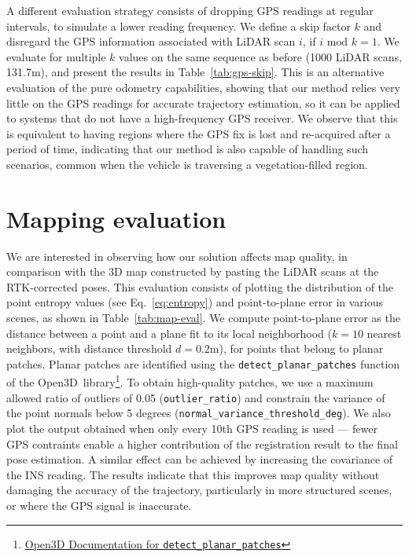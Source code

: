 A different evaluation strategy consists of dropping GPS readings at regular intervals, to simulate a lower reading frequency. We define a skip factor $k$ and disregard the GPS information associated with LiDAR scan $i$, if $i \text{ mod } k =1$. We evaluate for multiple $k$ values on the same sequence as before (1000 LiDAR scans, 131.7m), and present the results in Table~\ref{tab:gps-skip}. This is an alternative evaluation of the pure odometry capabilities, showing that our method relies very little on the GPS readings for accurate trajectory estimation, so it can be applied to systems that do not have a high-frequency GPS receiver. We observe that this is equivalent to having regions where the GPS fix is lost and re-acquired after a period of time, indicating that our method is also capable of handling such scenarios, common when the vehicle is traversing a vegetation-filled region.

\section{Mapping evaluation}

We are interested in observing how our solution affects map quality, in comparison with the 3D map constructed by pasting the LiDAR scans at the RTK-corrected poses. This evaluation consists of plotting the distribution of the point entropy values (see Eq.~\ref{eq:entropy}) and point-to-plane error in various scenes, as shown in Table~\ref{tab:map-eval}. We compute point-to-plane error as the distance between a point and a plane fit to its local neighborhood ($k=10$ nearest neighbors, with distance threshold $d=0.2$m), for points that belong to planar patches. Planar patches are identified using the \texttt{detect\_planar\_patches} function of the Open3D~library\footnote{\href{https://www.open3d.org/docs/latest/python_api/open3d.geometry.PointCloud.html\#open3d.geometry.PointCloud.detect_planar_patches}{Open3D Documentation for \texttt{detect\_planar\_patches}}}. To obtain high-quality patches, we use a maximum allowed ratio of outliers of 0.05 (\texttt{outlier\_ratio}) and constrain the variance of the point normals below 5 degrees (\texttt{normal\_variance\_threshold\_deg}).
We also plot the output obtained when only every 10th GPS reading is used --- fewer GPS contraints enable a higher contribution of the registration result to the final pose estimation. A similar effect can be achieved by increasing the covariance of the INS reading. The results indicate that this improves map quality without damaging the accuracy of the trajectory, particularly in more structured scenes, or where the GPS signal is inaccurate.

